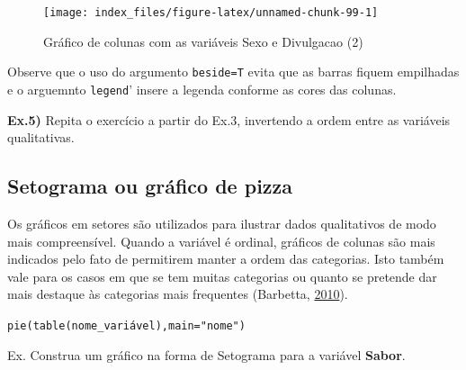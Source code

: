 \documentclass[12pt,brazil,oneside]{book}
\begin{document}
\begin{figure}[H]

{\centering \texttt{[image: index\_files/figure-latex/unnamed-chunk-99-1]} 

}

\caption{Gráfico de colunas com as variáveis Sexo e Divulgacao (2)}\label{fig:unnamed-chunk-99}
\end{figure}

Observe que o uso do argumento \texttt{beside=T} evita que as barras fiquem empilhadas e o arguemnto \texttt{legend}' insere a legenda conforme as cores das colunas.

\textbf{Ex.5)} Repita o exercício a partir do Ex.3, invertendo a ordem entre as variáveis qualitativas.

\hypertarget{setograma-ou-grafico-de-pizza}{%
\subsection{Setograma ou gráfico de pizza}\label{setograma-ou-grafico-de-pizza}}

Os gráficos em setores são utilizados para ilustrar dados qualitativos de modo mais compreensível. Quando a variável é ordinal, gráficos de colunas são mais indicados pelo fato de permitirem manter a ordem das categorias. Isto também vale para os casos em que se tem muitas categorias ou quanto se pretende dar mais destaque às categorias mais frequentes (Barbetta, \protect\hyperlink{ref-barbetta1988}{2010}).

\texttt{pie(table(nome\_variável),main="nome")}

Ex. Construa um gráfico na forma de Setograma para a variável \textbf{Sabor}.
\end{document}
